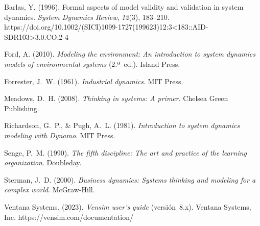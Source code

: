 \documentclass[10pt,a4paper]{article}
\begin{document}
\begin{flushleft}
\setlength{\parindent}{0pt}

\hangindent=1cm
Barlas, Y. (1996). Formal aspects of model validity and validation in system dynamics. \textit{System Dynamics Review}, \textit{12}(3), 183--210. https://doi.org/10.1002/(SICI)1099-1727(199623)12:3<183::AID-SDR103>3.0.CO;2-4

\vspace{8pt}
\hangindent=1cm
Ford, A. (2010). \textit{Modeling the environment: An introduction to system dynamics models of environmental systems} (2.ª~ed.). Island Press.

\vspace{8pt}
\hangindent=1cm
Forrester, J.~W. (1961). \textit{Industrial dynamics}. MIT Press.

\vspace{8pt}
\hangindent=1cm
Meadows, D.~H. (2008). \textit{Thinking in systems: A primer}. Chelsea Green Publishing.

\vspace{8pt}
\hangindent=1cm
Richardson, G.~P., \& Pugh, A.~L. (1981). \textit{Introduction to system dynamics modeling with Dynamo}. MIT Press.

\vspace{8pt}
\hangindent=1cm
Senge, P.~M. (1990). \textit{The fifth discipline: The art and practice of the learning organization}. Doubleday.

\vspace{8pt}
\hangindent=1cm
Sterman, J.~D. (2000). \textit{Business dynamics: Systems thinking and modeling for a complex world}. McGraw-Hill.

\vspace{8pt}
\hangindent=1cm
Ventana Systems. (2023). \textit{Vensim user's guide} (versión~8.x). Ventana Systems, Inc. https://vensim.com/documentation/

\end{flushleft}
\end{document}
